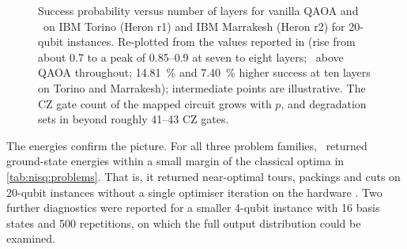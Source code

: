 \begin{figure}[htbp]
\centering
{}
\caption{Success probability versus number of layers for vanilla QAOA and \deal\ on IBM Torino (Heron r1) and IBM Marrakesh (Heron r2) for 20-qubit instances. Re-plotted from the values reported in \cite{guo2025deal} (rise from about 0.7 to a peak of 0.85--0.9 at seven to eight layers; \deal\ above QAOA throughout; \SI{14.81}{\percent} and \SI{7.40}{\percent} higher success at ten layers on Torino and Marrakesh); intermediate points are illustrative. The CZ gate count of the mapped circuit grows with $p$, and degradation sets in beyond roughly 41--43 CZ gates.}
\label{fig:nisq:deal-success}
\end{figure}

The energies confirm the picture. For all three problem families, \deal\ returned ground-state energies within a small margin of the classical optima in \cref{tab:nisq:problems}. That is, it returned near-optimal tours, packings and cuts on 20-qubit instances without a single optimiser iteration on the hardware \cite{guo2025deal}. Two further diagnostics were reported for a smaller 4-qubit instance with 16 basis states and 500 repetitions, on which the full output distribution could be examined.

